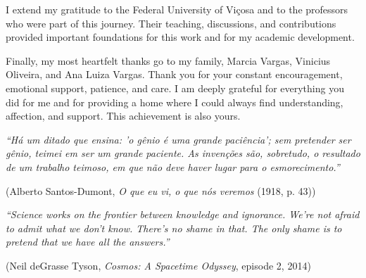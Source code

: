 \begin{agradecimentos}
        I extend my gratitude to the Federal University of Viçosa and to the professors who were part of this journey.
        Their teaching, discussions, and contributions provided important foundations for this work and for my academic
        development.

        Finally, my most heartfelt thanks go to my family, Marcia Vargas, Vinicius Oliveira, and Ana Luiza Vargas. Thank
        you for your constant encouragement, emotional support, patience, and care. I am deeply grateful for everything
        you did for me and for providing a home where I could always find understanding, affection, and support. This
        achievement is also yours.
    \end{agradecimentos}

    \begin{epigrafe}
        \vspace*{\fill}
        \begin{flushright}
            \singlespacing\itshape
            ``Há um ditado que ensina: 'o gênio é uma grande paciência'; sem pretender ser gênio, teimei em ser um
            grande paciente. As invenções são, sobretudo, o resultado de um trabalho teimoso, em que não deve haver
            lugar para o esmorecimento.''
            \par\vspace{0.3cm}\upshape
            (Alberto Santos-Dumont, \textit{O que eu vi, o que nós veremos} (1918, p. 43))
        \end{flushright}
        \vspace{1.5cm}
        \begin{flushright}
            \singlespacing\itshape
            ``Science works on the frontier between knowledge and ignorance. We're not afraid to
            admit what we don't know. There's no shame in that. The only shame is to pretend that
            we have all the answers.''
            \par\vspace{0.3cm}\upshape
            (Neil deGrasse Tyson, \textit{Cosmos: A Spacetime Odyssey}, episode 2, 2014)
        \end{flushright}
    \end{epigrafe}
    \fi

